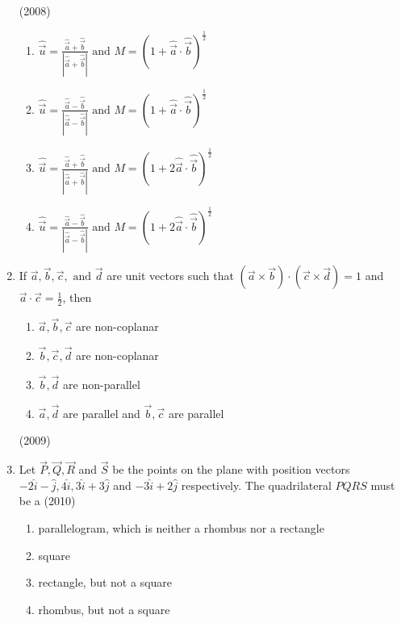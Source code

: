\begin{enumerate}[label=\thesubsection.\arabic*.,ref=\thesubsection.\theenumi]
    \hfill{(2008)}
    \begin{multicols}{2} 
    \begin{enumerate}
	    \item $\hat{\vec{u}} = \frac{\hat{\vec{a}}+\hat{\vec{b}}}{|\hat{\vec{a}}+\hat{\vec{b}}|} \text{ and } M = (1+\hat{\vec{a}} \cdot \hat{\vec{b}})^{\frac{1}{2}}$
    	\item $\hat{\vec{u}} = \frac{\hat{\vec{a}}-\hat{\vec{b}}}{|\hat{\vec{a}}-\hat{\vec{b}}|} \text{ and } M = (1+\hat{\vec{a}} \cdot \hat{\vec{b}})^{\frac{1}{2}}$
    	\item $\hat{\vec{u}} = \frac{\hat{\vec{a}}+\hat{\vec{b}}}{|\hat{\vec{a}}+\hat{\vec{b}}|} \text{ and } M = (1+2\hat{\vec{a}} \cdot \hat{\vec{b}})^{\frac{1}{2}}$
    	\item $\hat{\vec{u}} = \frac{\hat{\vec{a}}-\hat{\vec{b}}}{|\hat{\vec{a}}-\hat{\vec{b}}|} \text{ and } M = (1+2\hat{\vec{a}} \cdot \hat{\vec{b}})^{\frac{1}{2}}$
    \end{enumerate}
    \end{multicols}
    \item If $\vec{a}, \vec{b}, \vec{c},\text{ and } \vec{d}$ are unit vectors such that $(\vec{a} \times \vec{b}) \cdot (\vec{c} \times \vec{d}) = 1$  and  $\vec{a} \cdot \vec{c} = \frac{1}{2}$, then
    \begin{multicols}{2} 
    \begin{enumerate}
    	\item $\vec{a}, \vec{b}, \vec{c}$ are non-coplanar
    	\item $\vec{b}, \vec{c}, \vec{d}$ are non-coplanar
    	\item $\vec{b}, \vec{d}$ are non-parallel
    	\item $\vec{a}, \vec{d}$ are parallel and $\vec{b}, \vec{c}$ are parallel 
    \end{enumerate}
    \end{multicols}
    \hfill{(2009)}
    \item Let $\vec{P}, \vec{Q}, \vec{R}$ and $\vec{S}$ be the points on the plane with position vectors $-2\hat{i} -\hat{j}, 4\hat{i}, 3\hat{i}+3\hat{j}$ and $-3\hat{i}+2\hat{j}$ respectively. The quadrilateral $PQRS$ must be a 
    \hfill{(2010)}
    \begin{enumerate}
    	\item parallelogram, which is neither a rhombus nor a rectangle 
    	\item square 
    	\item rectangle, but not a square
    	\item rhombus, but not a square 

\end{enumerate}
\end{enumerate}
